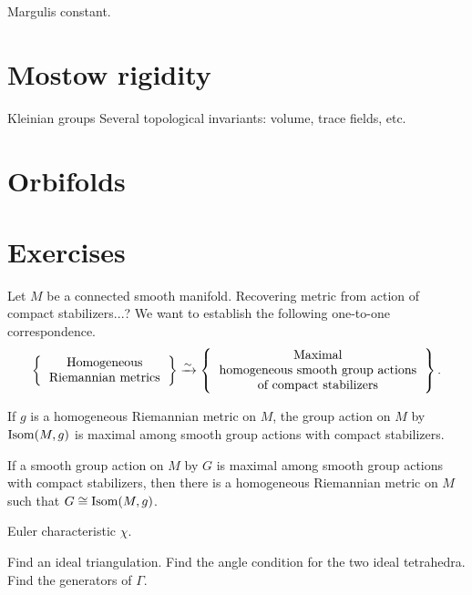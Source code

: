 \documentclass{../../large}
\begin{document}
\begin{prb}
Margulis constant.
\end{prb}

\begin{prb}
\end{prb}


\section{Mostow rigidity}
Kleinian groups
Several topological invariants: volume, trace fields, etc.


\section{Orbifolds}


\section*{Exercises}

\begin{prb}
Let $M$ be a connected smooth manifold.
Recovering metric from action of compact stabilizers...?
We want to establish the following one-to-one correspondence.
\[\left\{\begin{tabular}{c}Homogeneous\\Riemannian metrics\end{tabular}\right\}\xrightarrow{\sim}\left\{\begin{tabular}{c}Maximal\\homogeneous smooth group actions\\of compact stabilizers\end{tabular}\right\}.\]
\begin{parts}
\item If $g$ is a homogeneous Riemannian metric on $M$, the group action on $M$ by $\operatorname{Isom}(M,g)$ is maximal among smooth group actions with compact stabilizers.
\item If a smooth group action on $M$ by $G$ is maximal among smooth group actions with compact stabilizers, then there is a homogeneous Riemannian metric on $M$ such that $G\cong\operatorname{Isom}(M,g)$.
\end{parts}
\end{prb}
\begin{pf}
\end{pf}

\begin{prb}
Euler characteristic $\chi$.
\end{prb}
\begin{prb}
Find an ideal triangulation.
Find the angle condition for the two ideal tetrahedra.
Find the generators of $\Gamma$.
\end{prb}
\begin{prb}
\end{prb}
\begin{prb}
\end{prb}
\end{document}
